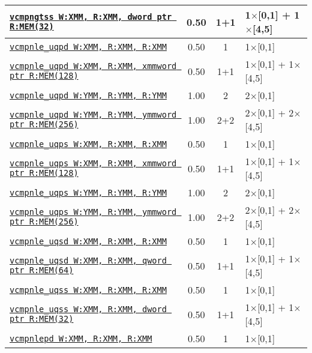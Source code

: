 \documentclass[a4paper,english,fontsize=9]{scrartcl}
\begin{document}
\begin{longtable}{p{}ccL{.25\textwidth}}
  \midrule
  \texttt{\href{https://felixcloutier.com/x86/CMPSS.html}{vcmpngtss W:XMM, R:XMM, dword ptr R:MEM(32)}} & 0.50 & 1+1 & 1\(\times\)[0,1] + 1\(\times\)[4,5] \\
  \midrule
  \texttt{\href{https://felixcloutier.com/x86/CMPPD.html}{vcmpnle\_uqpd W:XMM, R:XMM, R:XMM}} & 0.50 & 1 & 1\(\times\)[0,1] \\
  \midrule
  \texttt{\href{https://felixcloutier.com/x86/CMPPD.html}{vcmpnle\_uqpd W:XMM, R:XMM, xmmword ptr R:MEM(128)}} & 0.50 & 1+1 & 1\(\times\)[0,1] + 1\(\times\)[4,5] \\
  \midrule
  \texttt{\href{https://felixcloutier.com/x86/CMPPD.html}{vcmpnle\_uqpd W:YMM, R:YMM, R:YMM}} & 1.00 & 2 & 2\(\times\)[0,1] \\
  \midrule
  \texttt{\href{https://felixcloutier.com/x86/CMPPD.html}{vcmpnle\_uqpd W:YMM, R:YMM, ymmword ptr R:MEM(256)}} & 1.00 & 2+2 & 2\(\times\)[0,1] + 2\(\times\)[4,5] \\
  \midrule
  \texttt{\href{https://felixcloutier.com/x86/CMPPS.html}{vcmpnle\_uqps W:XMM, R:XMM, R:XMM}} & 0.50 & 1 & 1\(\times\)[0,1] \\
  \midrule
  \texttt{\href{https://felixcloutier.com/x86/CMPPS.html}{vcmpnle\_uqps W:XMM, R:XMM, xmmword ptr R:MEM(128)}} & 0.50 & 1+1 & 1\(\times\)[0,1] + 1\(\times\)[4,5] \\
  \midrule
  \texttt{\href{https://felixcloutier.com/x86/CMPPS.html}{vcmpnle\_uqps W:YMM, R:YMM, R:YMM}} & 1.00 & 2 & 2\(\times\)[0,1] \\
  \midrule
  \texttt{\href{https://felixcloutier.com/x86/CMPPS.html}{vcmpnle\_uqps W:YMM, R:YMM, ymmword ptr R:MEM(256)}} & 1.00 & 2+2 & 2\(\times\)[0,1] + 2\(\times\)[4,5] \\
  \midrule
  \texttt{\href{https://felixcloutier.com/x86/CMPSD.html}{vcmpnle\_uqsd W:XMM, R:XMM, R:XMM}} & 0.50 & 1 & 1\(\times\)[0,1] \\
  \midrule
  \texttt{\href{https://felixcloutier.com/x86/CMPSD.html}{vcmpnle\_uqsd W:XMM, R:XMM, qword ptr R:MEM(64)}} & 0.50 & 1+1 & 1\(\times\)[0,1] + 1\(\times\)[4,5] \\
  \midrule
  \texttt{\href{https://felixcloutier.com/x86/CMPSS.html}{vcmpnle\_uqss W:XMM, R:XMM, R:XMM}} & 0.50 & 1 & 1\(\times\)[0,1] \\
  \midrule
  \texttt{\href{https://felixcloutier.com/x86/CMPSS.html}{vcmpnle\_uqss W:XMM, R:XMM, dword ptr R:MEM(32)}} & 0.50 & 1+1 & 1\(\times\)[0,1] + 1\(\times\)[4,5] \\
  \midrule
  \texttt{\href{https://felixcloutier.com/x86/CMPPD.html}{vcmpnlepd W:XMM, R:XMM, R:XMM}} & 0.50 & 1 & 1\(\times\)[0,1] \\

\end{longtable}
\end{document}
